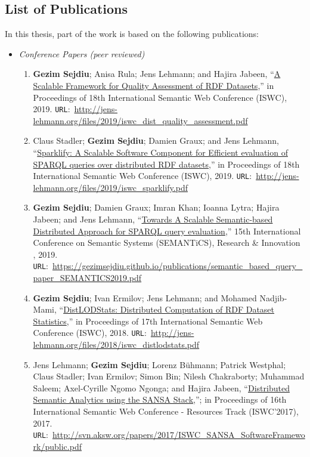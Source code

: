 \subsection{List of Publications}
In this thesis, part of the work is based on the following publications:
\begin{itemize}
\item \emph{Conference Papers (peer reviewed)}
\begin{enumerate}
    
    \item \textbf{Gezim Sejdiu}; Anisa Rula; Jens Lehmann; and Hajira Jabeen, “\href{http://jens-lehmann.org/files/2019/iswc_dist_quality_assessment.pdf}{A Scalable Framework for Quality Assessment of RDF Datasets},” in Proceedings of 18th International Semantic Web Conference (ISWC), 2019. \texttt{URL}:~\url{http://jens-lehmann.org/files/2019/iswc_dist_quality_assessment.pdf}

    \item Claus Stadler; \textbf{Gezim Sejdiu}; Damien Graux; and Jens Lehmann, “\href{http://jens-lehmann.org/files/2019/iswc_sparklify.pdf}{Sparklify: A Scalable Software Component for Efficient evaluation of SPARQL queries over distributed RDF datasets},” in Proceedings of 18th International Semantic Web Conference (ISWC), 2019. \texttt{URL}:~\url{http://jens-lehmann.org/files/2019/iswc_sparklify.pdf}

    \item \textbf{Gezim Sejdiu}; Damien Graux; Imran Khan; Ioanna Lytra; Hajira Jabeen; and Jens Lehmann, “\href{https://gezimsejdiu.github.io/publications/semantic_based_query_paper_SEMANTICS2019.pdf}{Towards A Scalable Semantic-based Distributed Approach for SPARQL query evaluation},” 15th International Conference on Semantic Systems (SEMANTiCS), Research \& Innovation , 2019. \texttt{URL}:~\url{https://gezimsejdiu.github.io/publications/semantic_based_query_paper_SEMANTICS2019.pdf}

    \item \textbf{Gezim Sejdiu}; Ivan Ermilov; Jens Lehmann; and Mohamed Nadjib-Mami, “\href{http://jens-lehmann.org/files/2018/iswc_distlodstats.pdf}{DistLODStats: Distributed Computation of RDF Dataset Statistics},” in Proceedings of 17th International Semantic Web Conference (ISWC), 2018. \texttt{URL}:~\url{http://jens-lehmann.org/files/2018/iswc_distlodstats.pdf}

    \item Jens Lehmann; \textbf{Gezim Sejdiu}; Lorenz Bühmann; Patrick Westphal; Claus Stadler; Ivan Ermilov; Simon Bin; Nilesh Chakraborty; Muhammad Saleem; Axel-Cyrille Ngomo Ngonga; and Hajira Jabeen, “\href{http://svn.aksw.org/papers/2017/ISWC_SANSA_SoftwareFramework/public.pdf}{Distributed Semantic Analytics using the SANSA Stack},”; in Proceedings of 16th International Semantic Web Conference - Resources Track (ISWC’2017), 2017. \texttt{URL}:~\url{http://svn.aksw.org/papers/2017/ISWC_SANSA_SoftwareFramework/public.pdf}


\end{enumerate}
\end{itemize}
